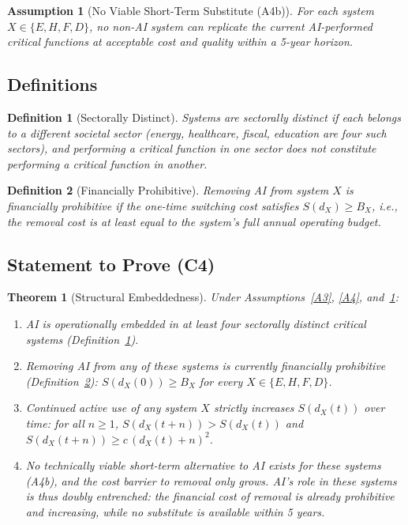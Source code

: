 \documentclass[12pt]{article}
\newtheorem{theorem}{Theorem}
\newtheorem{assumption}{Assumption}
\newtheorem{definition}{Definition}
\begin{document}
\begin{assumption}[No Viable Short-Term Substitute (A4b)]\label{A4b}
  For each system $X \in \{E,H,F,D\}$, no non-AI system can replicate
  the current AI-performed critical functions at acceptable cost and
  quality within a 5-year horizon.
\end{assumption}

\subsection*{Definitions}

\begin{definition}[Sectorally Distinct]\label{defSD}
  Systems are \emph{sectorally distinct} if each belongs to a different
  societal sector (energy, healthcare, fiscal, education are
  four such sectors), and performing a critical function in one sector
  does not constitute performing a critical function in another.
\end{definition}

\begin{definition}[Financially Prohibitive]\label{defFP}
  Removing AI from system $X$ is \emph{financially prohibitive} if the
  one-time switching cost satisfies $S(d_X) \geq B_X$, i.e., the
  removal cost is at least equal to the system's full annual operating
  budget.
\end{definition}

\subsection*{Statement to Prove (C4)}

\begin{theorem}[Structural Embeddedness]\label{thm:C4}
  Under Assumptions~\ref{A3}, \ref{A4}, and~\ref{A4b}:
  \begin{enumerate}
    \item[(i)] AI is operationally embedded in at least four sectorally
      distinct critical systems (Definition~\ref{defSD}).
    \item[(ii)] Removing AI from any of these systems is currently
      financially prohibitive (Definition~\ref{defFP}):
      $S(d_X(0)) \geq B_X$ for every $X \in \{E,H,F,D\}$.
    \item[(iii)] Continued active use of any system $X$ strictly increases
      $S(d_X(t))$ over time: for all $n \geq 1$,
      $S(d_X(t+n)) > S(d_X(t))$ and
      $S(d_X(t+n)) \geq c\,(d_X(t) + n)^2$.
    \item[(iv)] No technically viable short-term alternative to AI exists
      for these systems (A4b), and the cost barrier to removal only
      grows.  AI's role in these systems is thus doubly entrenched: the
      financial cost of removal is already prohibitive and increasing,
      while no substitute is available within 5 years.
  \end{enumerate}
\end{theorem}
\end{document}
